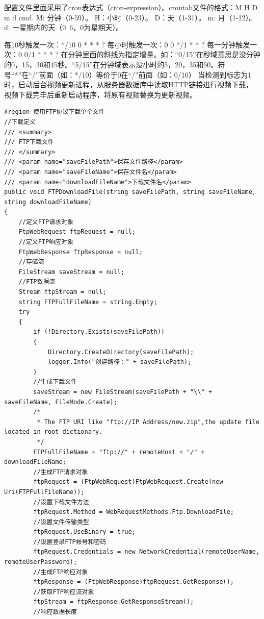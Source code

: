 \documentclass{book}
\begin{document}
配置文件里面采用了cron表达式（cron-expression）。crontab文件的格式：M H D m d cmd.
M: 分钟（0-59）。
H：小时（0-23）。
D：天（1-31）。
m: 月（1-12）。
d: 一星期内的天（0~6，0为星期天）。

\noindent 每10秒触发一次：*/10 0 * * * ?\newline
每小时触发一次：0 0 */1 * * ?\newline
每一分钟触发一次：0 0/1 * * * ?\newline
在分钟里面的斜线为指定增量。如：“0/15”在秒域意思是没分钟的0，15，30和45秒。“5/15”在分钟域表示没小时的5，20，35和50。符号“*”在“/”前面（如：*/10）等价于0在“/”前面（如：0/10）
当检测到标志为1时，启动后台视频更新进程，从服务器数据库中读取HTTP链接进行视频下载，
视频下载完毕后重新启动程序，将原有视频替换为更新视频。

\begin{lstlisting}
#region 使用FTP协议下载单个文件
//下载定义
/// <summary>
/// FTP下载文件
/// </summary>
/// <param name="saveFilePath">保存文件路径</param>
/// <param name="saveFileName">保存文件名</param>
/// <param name="downloadFileName">下载文件名</param>
public void FTPDownloadFile(string saveFilePath, string saveFileName, string downloadFileName)
{
    //定义FTP请求对象
    FtpWebRequest ftpRequest = null;
    //定义FTP响应对象
    FtpWebResponse ftpResponse = null;
    //存储流
    FileStream saveStream = null;
    //FTP数据流
    Stream ftpStream = null;
    string FTPFullFileName = string.Empty;
    try
    {
        if (!Directory.Exists(saveFilePath))
        {
            Directory.CreateDirectory(saveFilePath);
            logger.Info("创建路径：" + saveFilePath);
        }
        //生成下载文件
        saveStream = new FileStream(saveFilePath + "\\" + saveFileName, FileMode.Create);
        /*
         * The FTP URI like "ftp://IP Address/new.zip",the update file located in root dictionary.
         */
        FTPFullFileName = "ftp://" + remoteHost + "/" + downloadFileName;
        //生成FTP请求对象
        ftpRequest = (FtpWebRequest)FtpWebRequest.Create(new Uri(FTPFullFileName));
        //设置下载文件方法
        ftpRequest.Method = WebRequestMethods.Ftp.DownloadFile;
        //设置文件传输类型
        ftpRequest.UseBinary = true;
        //设置登录FTP帐号和密码
        ftpRequest.Credentials = new NetworkCredential(remoteUserName, remoteUserPassword);
        //生成FTP响应对象
        ftpResponse = (FtpWebResponse)ftpRequest.GetResponse();
        //获取FTP响应流对象
        ftpStream = ftpResponse.GetResponseStream();
        //响应数据长度

\end{lstlisting}
\end{document}
